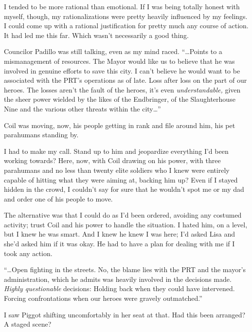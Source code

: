 I tended to be more rational than emotional.  If I was being totally honest with myself, though, my rationalizations were pretty heavily influenced by my feelings.  I could come up with a rational justification for pretty much any course of action.  It had led me this far.  Which wasn't necessarily a good thing.



Councilor Padillo was still talking, even as my mind raced.  ``\ldots{}Points to a mismanagement of resources.  The Mayor would like us to believe that he was involved in genuine efforts to save this city.  I can't believe he would want to be associated with the PRT's operations as of late.  Loss after loss on the part of our heroes.  The losses aren't the fault of the heroes, it's even \emph{understandable, }given the sheer power wielded by the likes of the Endbringer, of the Slaughterhouse Nine and the various other threats within the city\ldots''



Coil was moving, now, his people getting in rank and file around him, his pet parahumans standing by.



I had to make my call.  Stand up to him and jeopardize everything I'd been working towards?  Here, now, with Coil drawing on his power, with three parahumans and no less than twenty elite soldiers who I knew were entirely capable of hitting what they were aiming at, backing him up?  Even if I stayed hidden in the crowd, I couldn't say for sure that he wouldn't spot me or my dad and order one of his people to move.



The alternative was that I could do as I'd been ordered, avoiding any costumed activity; trust Coil and his power to handle the situation.  I hated him, on a level, but I knew he was smart.  And I knew he knew I was here; I'd asked Lisa and she'd asked him if it was okay.  He had to have a plan for dealing with me if I took any action.



``\ldots{}Open fighting in the streets.  No, the blame lies with the PRT and the mayor's administration, which he admits was heavily involved in the decisions made.  \emph{Highly questionable} decisions:  Holding back when they could have intervened.  Forcing confrontations when our heroes were gravely outmatched.''



I saw Piggot shifting uncomfortably in her seat at that.  Had this been arranged?  A staged scene?



